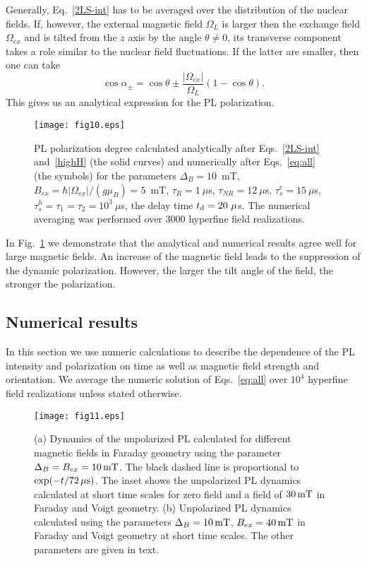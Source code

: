 \documentclass[twocolumn,showpacs,preprintnumbers,amsmath,amssymb,aps]{revtex4-1}
\begin{document}
Generally, Eq.~\eqref{2LS-int} has to be averaged over the
distribution of the nuclear fields. If, however, the external
magnetic field $\Omega_L$ is larger then the exchange field
$\Omega_{ex}$ and is tilted from the $z$ axis by the angle $\theta
\ne 0$, its transverse component takes a role similar to the
nuclear field fluctuations. If the latter are smaller, then one can
take
\begin{equation}\label{highH}
  \cos\alpha_{\pm} = \cos\theta \pm \frac{|\Omega_{ex}|}{\Omega_L}(1-\cos\theta).
\end{equation}
This gives us an analytical expression for the PL polarization.

\begin{figure}[t]
\centering
\texttt{[image: fig10.eps]}
\caption{PL polarization degree calculated analytically after
Eqs.~\eqref{2LS-int} and~\eqref{highH} (the solid curves) and
numerically after Eqs.~\eqref{eq:all} (the symbols) for the
parameters $\Delta_B = 10$~mT, $B_{ex} = \hbar |\Omega_{ex}|
/(g\mu_B)= 5$~mT, $\tau_R = 1~\mu$s, $\tau_{NR} = 12~\mu$s,
$\tau_s^e = 15~\mu$s, $\tau_s^h = \tau_1=\tau_2 = 10^3~\mu$s, the
delay time $t_{\rm d} = 20~\mu$s. The numerical averaging was
performed over 3000 hyperfine field realizations.} \label{fig10}
\end{figure}

In Fig.~\ref{fig10} we demonstrate that  the analytical and
numerical results agree well for large magnetic fields. An increase
of the magnetic field leads to the suppression of the dynamic
polarization. However, the larger the tilt angle of the field, the
stronger the polarization.

\subsection{Numerical results}
\label{sec:num}

In this section we use  numeric calculations to describe the
dependence of the PL intensity and polarization on time as well as
magnetic field strength and orientation. We average the numeric
solution of Eqs.~\eqref{eq:all} over $10^4$ hyperfine field
realizations unless stated otherwise.

\begin{figure}[t]
\centering
\texttt{[image: fig11.eps]}
\caption{(a) Dynamics of the unpolarized PL calculated for different
magnetic fields in Faraday geometry using the parameter $\Delta_B =
B_{ex} = 10 \, {\rm mT}$. The black dashed line is proportional to
$\exp(-t/ 72 \, \mu{\rm s})$. The inset shows the unpolarized PL
dynamics calculated at short time scales for zero field and a field
of $30 \,{\rm mT}$ in Faraday and Voigt geometry. (b) Unpolarized PL
dynamics calculated using the parameters $\Delta_B  = 10 \, {\rm
mT}$, $B_{ex} = 40 \, {\rm mT}$ in Faraday and Voigt geometry at
short time scales. The other parameters are given in text.}
\label{fig11}
\end{figure}
\end{document}
